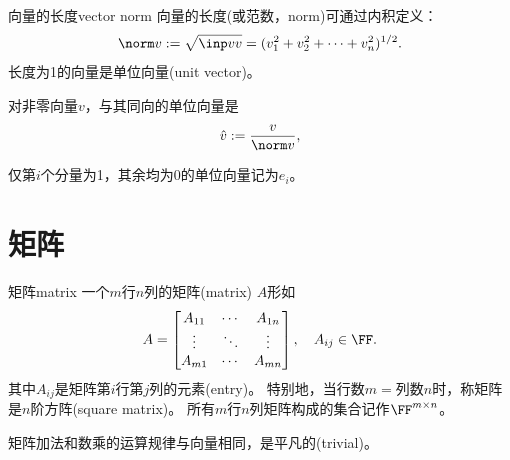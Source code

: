 \begin{definition}{向量的长度}{vector norm}
	向量的长度(或范数，norm)可通过内积定义：
	\begin{equation}
		\norm v:=\sqrt{\inp vv}=(v_1^2+v_2^2+\cdots+v_n^2)^{1/2}.
	\end{equation}
	长度为1的向量是单位向量(unit vector)。
\end{definition}
\begin{corollary}
	对非零向量$v$，与其同向的单位向量是
	\begin{equation}
		\hat v:=\frac{v}{\norm v},
	\end{equation}
\end{corollary}
\begin{remark}
	仅第$i$个分量为1，其余均为0的单位向量记为$e_i$。
\end{remark}


\section{矩阵}
\begin{definition}{矩阵}{matrix}
    一个$m$行$n$列的矩阵(matrix) $A$形如
    \[
        A=\begin{bmatrix}
            A_{11}&\cdots&A_{1n}\\
            \vdots&\ddots&\vdots\\
            A_{m1}&\cdots&A_{mn}
        \end{bmatrix},\quad A_{ij}\in\FF.
    \]
    其中$A_{ij}$是矩阵第$i$行第$j$列的元素(entry)。
	特别地，当行数$m=$列数$n$时，称矩阵是$n$阶方阵(square matrix)。
    \tcblower
	所有$m$行$n$列矩阵构成的集合记作$\FF^{m\times n}$。
\end{definition}

矩阵加法和数乘的运算规律与向量相同，是平凡的(trivial)。

